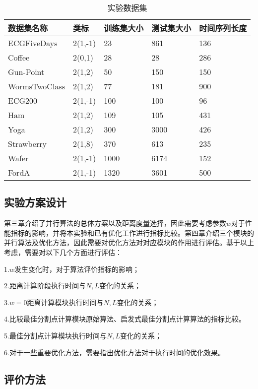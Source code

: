 \begin{table}[htbp]
	\centering
	\begin{minipage}{0.9\textwidth}
		\caption{实验数据集}
		\label{tab:dataset}
		\begin{tabular}{p{3cm}p{2cm}p{2cm}p{2cm}p{2.5cm}}
			\toprule[1.5pt]
			{\heiti 数据集名称} &{\heiti 类标 } & {\heiti 训练集大小} &{\heiti 测试集大小} &{\heiti 时间序列长度}\\\midrule[1pt]
			ECGFiveDays &2(1,-1) &23 &861 &136\\
			Coffee  &2(0,1) &28 &28 &286 \\
			Gun-Point    &2(1,2)&50&150&150\\
			WormsTwoClass&2(1,2)&77&181&900\\
			ECG200          &2(1,-1)&100&100&96\\
			Ham          &2(1,2)&109&105&431\\
			Yoga         &2(1,2)&300&3000&426\\
			Strawberry   &2(1,8)&370&613&235\\
			Wafer        &2(1,-1)&1000&6174&152\\
			FordA &2(1,-1) &1320 &3601 &500 \\
			\bottomrule[1.5pt]
		\end{tabular}
	\end{minipage}
\end{table}

\subsection{实验方案设计}
第三章介绍了并行算法的总体方案以及距离度量选择，因此需要考虑参数$w$对于性能指标的影响，并将本实验和已有优化工作进行指标比较。第四章介绍三个模块的并行算法及优化方法，因此需要对优化方法对对应模块的作用进行评估。基于以上考虑，需要对以下几个方面进行评估：

1.$w$发生变化时，对于算法评价指标的影响；

2.距离计算阶段执行时间与$N,L$变化的关系；

3.$w=0$距离计算模块执行时间与$N,L$变化的关系；

4.比较最佳分割点计算模块原始算法、启发式最佳分割点计算算法的指标比较。

5.最佳分割点计算模块执行时间与$N,L$变化的关系；

6.对于一些重要优化方法，需要指出优化方法对于执行时间的优化效果。
\subsection{评价方法}

